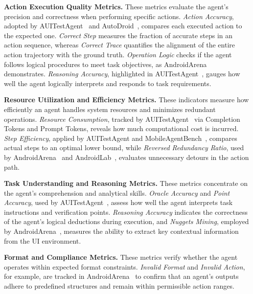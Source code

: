 \noindent\textbf{Action Execution Quality Metrics.}
These metrics evaluate the agent’s precision and correctness when performing specific actions. \emph{Action Accuracy}, adopted by AUITestAgent~\cite{hu2024auitestagent} and AutoDroid~\cite{zhang2023youautoui}, compares each executed action to the expected one. \emph{Correct Step} measures the fraction of accurate steps in an action sequence, whereas \emph{Correct Trace} quantifies the alignment of the entire action trajectory with the ground truth. \emph{Operation Logic} checks if the agent follows logical procedures to meet task objectives, as AndroidArena~\cite{xing2024AndroidArena} demonstrates. \emph{Reasoning Accuracy}, highlighted in AUITestAgent~\cite{hu2024auitestagent}, gauges how well the agent logically interprets and responds to task requirements.

\noindent\textbf{Resource Utilization and Efficiency Metrics.}
These indicators measure how efficiently an agent handles system resources and minimizes redundant operations. \emph{Resource Consumption}, tracked by AUITestAgent~\cite{hu2024auitestagent} via Completion Tokens and Prompt Tokens, reveals how much computational cost is incurred. \emph{Step Efficiency}, applied by AUITestAgent and MobileAgentBench~\cite{wang2024mobileagentbench}, compares actual steps to an optimal lower bound, while \emph{Reversed Redundancy Ratio}, used by AndroidArena~\cite{xing2024AndroidArena} and AndroidLab~\cite{xu2024androidlab}, evaluates unnecessary detours in the action path.

\noindent\textbf{Task Understanding and Reasoning Metrics.}
These metrics concentrate on the agent’s comprehension and analytical skills. \emph{Oracle Accuracy} and \emph{Point Accuracy}, used by AUITestAgent~\cite{hu2024auitestagent}, assess how well the agent interprets task instructions and verification points. \emph{Reasoning Accuracy} indicates the correctness of the agent’s logical deductions during execution, and \emph{Nuggets Mining}, employed by AndroidArena~\cite{xing2024AndroidArena}, measures the ability to extract key contextual information from the UI environment.

\noindent\textbf{Format and Compliance Metrics.}
These metrics verify whether the agent operates within expected format constraints. \emph{Invalid Format} and \emph{Invalid Action}, for example, are tracked in AndroidArena~\cite{xing2024AndroidArena} to confirm that an agent’s outputs adhere to predefined structures and remain within permissible action ranges.

